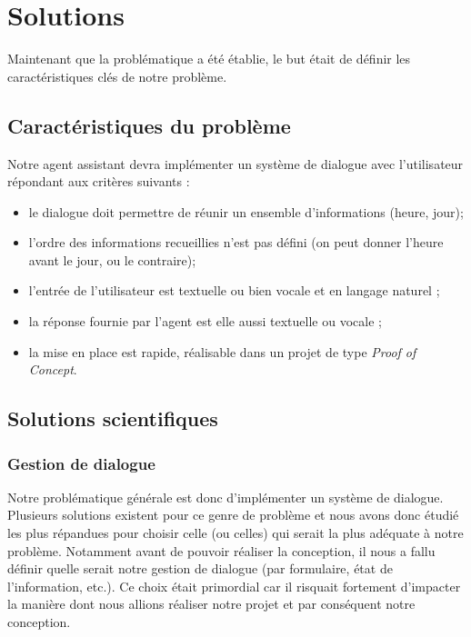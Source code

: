 \chapter{Solutions}

Maintenant que la problématique a été établie, le but était de définir les caractéristiques clés de notre problème.


\section{Caractéristiques du problème}
Notre agent assistant devra implémenter un système de dialogue avec l'utilisateur répondant aux critères suivants :
\begin{itemize}
	\item le dialogue doit permettre de réunir un ensemble d'informations (heure, jour);
 	\item l'ordre des informations recueillies n'est pas défini (on peut donner l'heure avant le jour, ou le contraire);
 	\item l'entrée de l'utilisateur est textuelle ou bien vocale et en langage naturel ;
 	\item la réponse fournie par l'agent est elle aussi textuelle ou vocale ;
 	\item la mise en place est rapide, réalisable dans un projet de type \textit{Proof of Concept}.
\end{itemize}

\section{Solutions scientifiques}

\subsection{Gestion de dialogue}
Notre problématique générale est donc d'implémenter un système de dialogue. Plusieurs solutions existent pour ce genre de problème et nous avons donc étudié les plus répandues pour choisir celle (ou celles) qui serait la plus adéquate à notre problème. Notamment avant de pouvoir réaliser la conception, il nous a fallu définir quelle serait notre gestion de dialogue \cite{dialog-manager} (par formulaire, état de l'information, etc.). Ce choix était primordial car il risquait fortement d'impacter la manière dont nous allions réaliser notre projet et par conséquent notre conception.


\FloatBarrier


